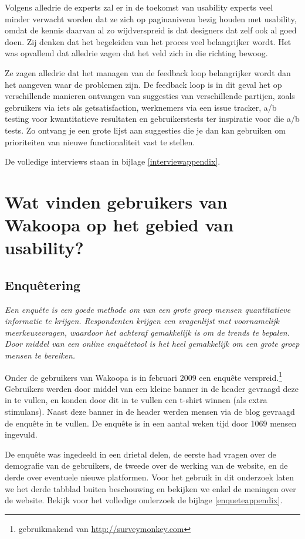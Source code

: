 \documentclass[a4paper, 10pt, pdftex]{report}
\begin{document}
    Volgens alledrie de experts zal er in de toekomst van usability experts veel minder verwacht worden dat ze zich op paginaniveau bezig houden met usability, omdat de kennis daarvan al zo wijdverspreid is dat designers dat zelf ook al goed doen. Zij denken dat het begeleiden van het proces veel belangrijker wordt. Het was opvallend dat alledrie zagen dat het veld zich in die richting bewoog.

    Ze zagen alledrie dat het managen van de feedback loop belangrijker wordt dan het aangeven waar de problemen zijn. De feedback loop is in dit geval het op verschillende manieren ontvangen van suggesties van verschillende partijen, zoals gebruikers via iets als getsatisfaction, werknemers via een issue tracker, a/b testing voor kwantitatieve resultaten en gebruikerstests ter inspiratie voor die a/b tests. Zo ontvang je een grote lijst aan suggesties die je dan kan gebruiken om prioriteiten van nieuwe functionaliteit vast te stellen.

    De volledige interviews staan in bijlage \ref{interviewappendix}.

  \newpage
  \chapter{Wat vinden gebruikers van Wakoopa op het gebied van usability?}
    \label{userchapter}
    \newpage
    \section{Enqu\^etering}
    \textit{Een enqu\^ete is een goede methode om van een grote groep mensen quantitatieve informatie te krijgen. Respondenten krijgen een vragenlijst met voornamelijk meerkeuzevragen, waardoor het achteraf gemakkelijk is om de trends te bepalen. Door middel van een online enqu\^etetool is het heel gemakkelijk om een grote groep mensen te bereiken.}

    Onder de gebruikers van Wakoopa is in februari 2009 een enqu\^ete verspreid.\footnote{gebruikmakend van \url{http://surveymonkey.com}} Gebruikers werden door middel van een kleine banner in de header gevraagd deze in te vullen, en konden door dit in te vullen een t-shirt winnen (als extra stimulans). Naast deze banner in de header werden mensen via de blog gevraagd de enqu\^ete in te vullen. De enqu\^ete is in een aantal weken tijd door 1069 mensen ingevuld.

    De enqu\^ete was ingedeeld in een drietal delen, de eerste had vragen over de demografie van de gebruikers, de tweede over de werking van de website, en de derde over eventuele nieuwe platformen. Voor het gebruik in dit onderzoek laten we het derde tabblad buiten beschouwing en bekijken we enkel de meningen over de website. Bekijk voor het volledige onderzoek de bijlage \ref{enqueteappendix}.
\end{document}
